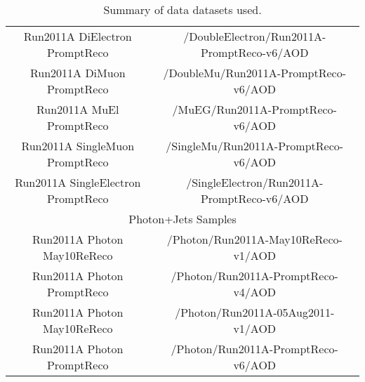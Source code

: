 \begin{table}[!ht]
\begin{center}
\begin{tabular}{|c|c|}
Run2011A DiElectron PromptReco      &  /DoubleElectron/Run2011A-PromptReco-v6/AOD   \\
Run2011A DiMuon PromptReco          &  /DoubleMu/Run2011A-PromptReco-v6/AOD   \\
Run2011A MuEl PromptReco            &  /MuEG/Run2011A-PromptReco-v6/AOD   \\
Run2011A SingleMuon PromptReco      &  /SingleMu/Run2011A-PromptReco-v6/AOD   \\
Run2011A SingleElectron PromptReco  &  /SingleElectron/Run2011A-PromptReco-v6/AOD   \\
\hline
\hline
\multicolumn{2}{|c|}{Photon+Jets Samples} \\
\hline
Run2011A Photon May10ReReco         & /Photon/Run2011A-May10ReReco-v1/AOD \\
Run2011A Photon PromptReco          & /Photon/Run2011A-PromptReco-v4/AOD \\
Run2011A Photon May10ReReco         & /Photon/Run2011A-05Aug2011-v1/AOD \\
Run2011A Photon PromptReco          & /Photon/Run2011A-PromptReco-v6/AOD \\

\hline
\end{tabular}
\caption{Summary of data datasets used.}
\label{tab:DatasetsData}
\end{center}
\end{table}

